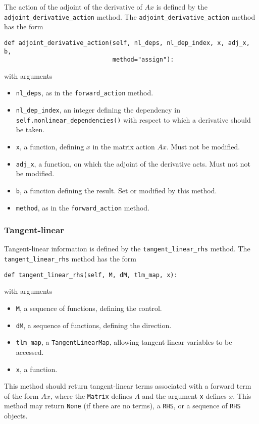 \documentclass[11pt]{article}
\begin{document}
The action of the adjoint of the derivative of $A x$ is defined by the
\texttt{adjoint\_derivative\_action} method. The
\texttt{adjoint\_derivative\_action} method has the form
\begin{lstlisting}
def adjoint_derivative_action(self, nl_deps, nl_dep_index, x, adj_x, b,
                              method="assign"):
\end{lstlisting}
with arguments
\begin{itemize}
  \item \texttt{nl\_deps}, as in the \texttt{forward\_action} method.
  \item \texttt{nl\_dep\_index}, an integer defining the dependency in
    \texttt{self.nonlinear\_dependencies()} with respect to which a derivative
    should be taken.
  \item \texttt{x}, a function, defining $x$ in the matrix action $A x$. Must
    not be modified.
  \item \texttt{adj\_x}, a function, on which the adjoint of the derivative
    acts. Must not not be modified.
  \item \texttt{b}, a function defining the result. Set or modified by this
    method.
  \item \texttt{method}, as in the \texttt{forward\_action} method.
\end{itemize}

\subsubsection{Tangent-linear}

Tangent-linear information is defined by the \texttt{tangent\_linear\_rhs}
method. The \texttt{tangent\_linear\_rhs} method has the form
\begin{lstlisting}
def tangent_linear_rhs(self, M, dM, tlm_map, x):
\end{lstlisting}
with arguments
\begin{itemize}
  \item \texttt{M}, a sequence of functions, defining the control.
  \item \texttt{dM}, a sequence of functions, defining the direction.
  \item \texttt{tlm\_map}, a \texttt{TangentLinearMap}, allowing tangent-linear
    variables to be accessed.
  \item \texttt{x}, a function.
\end{itemize}
This method should return tangent-linear terms associated with a forward term
of the form $A x$, where the \texttt{Matrix} defines $A$ and the argument
\texttt{x} defines $x$. This method may return \texttt{None} (if there are no
terms), a \texttt{RHS}, or a sequence of \texttt{RHS} objects.
\end{document}
